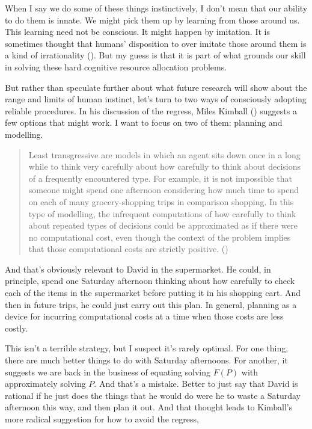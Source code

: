 \documentclass[
  11pt,
  letterpaper,
  DIV=11,
  numbers=noendperiod,
  oneside]{scrartcl}
\begin{document}
When I say we do some of these things instinctively, I don't mean that
our ability to do them is innate. We might pick them up by learning from
those around us. This learning need not be conscious. It might happen by
imitation. It is sometimes thought that humans' disposition to over
imitate those around them is a kind of irrationality
(). But my guess is
that it is part of what grounds our skill in solving these hard
cognitive resource allocation problems.

But rather than speculate further about what future research will show
about the range and limits of human instinct, let's turn to two ways of
consciously adopting reliable procedures. In his discussion of the
regress, Miles Kimball () suggests a few
options that might work. I want to focus on two of them: planning and
modelling.

\begin{quote}
Least transgressive are models in which an agent sits down once in a
long while to think very carefully about how carefully to think about
decisions of a frequently encountered type. For example, it is not
impossible that someone might spend one afternoon considering how much
time to spend on each of many grocery-shopping trips in comparison
shopping. In this type of modelling, the infrequent computations of how
carefully to think about repeated types of decisions could be
approximated as if there were no computational cost, even though the
context of the problem implies that those computational costs are
strictly positive. ()
\end{quote}

And that's obviously relevant to David in the supermarket. He could, in
principle, spend one Saturday afternoon thinking about how carefully to
check each of the items in the supermarket before putting it in his
shopping cart. And then in future trips, he could just carry out this
plan. In general, planning as a device for incurring computational costs
at a time when those costs are less costly.

This isn't a terrible strategy, but I suspect it's rarely optimal. For
one thing, there are much better things to do with Saturday afternoons.
For another, it suggests we are back in the business of equating solving
\(F(P)\) with approximately solving \(P\). And that's a mistake. Better
to just say that David is rational if he just does the things that he
would do were he to waste a Saturday afternoon this way, and then plan
it out. And that thought leads to Kimball's more radical suggestion for
how to avoid the regress,
\end{document}
